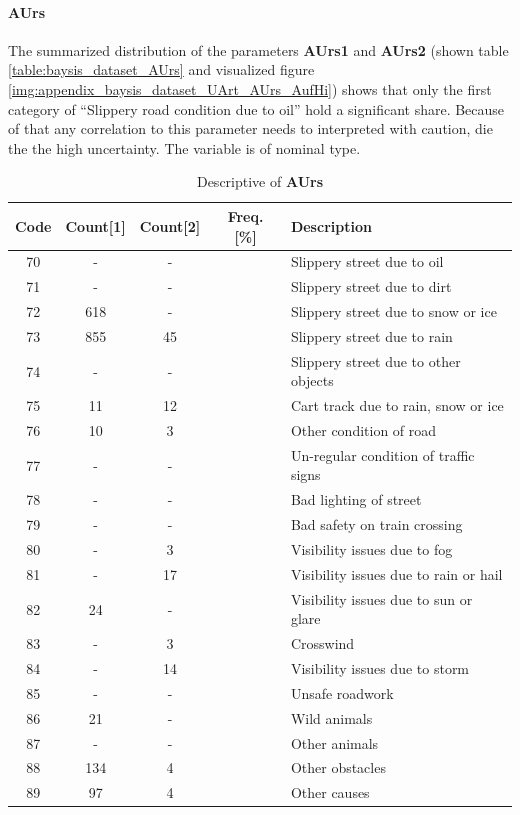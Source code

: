 \paragraph{AUrs}
The summarized distribution of the parameters \textbf{AUrs1} and \textbf{AUrs2} (shown table \autoref{table:baysis_dataset_AUrs} and visualized figure \autoref{img:appendix_baysis_dataset_UArt_AUrs_AufHi}) shows that only the first category of “Slippery road condition due to oil” hold a significant share. Because of that any correlation to this parameter needs to interpreted with caution, die the the high uncertainty. The variable is of nominal type.
\begin{table}[ht]
	\centering
	\small
	\begin{tabular}{c|c|c|c|l}
		\toprule
		Code & Count[1] & Count[2] & Freq. [\%] & Description \\ 
		\midrule
		70 & - 		& -		& & Slippery street due to oil \\
		71 & -		& -		& & Slippery street due to dirt \\
		72 & 618	& -		& & Slippery street due to snow or ice \\
		73 & 855	& 45	& & Slippery street due to rain \\
		74 & -		& -		& & Slippery street due to other objects \\
		75 & 11		& 12	& & Cart track due to rain, snow or ice \\
		76 & 10		& 3		& & Other condition of road \\
		77 & -		& -		& & Un-regular condition of traffic signs \\
		78 & -		& -		& & Bad lighting of street \\
		79 & -		& -		& & Bad safety on train crossing \\
		80 & -		& 3		& & Visibility issues due to fog \\
		81 & -		& 17 	& & Visibility issues due to rain or hail \\
		82 & 24		& -		& & Visibility issues due to sun or glare \\
		83 & -		& 3		& & Crosswind \\
		84 & -		& 14	& & Visibility issues due to storm \\
		85 & -		& -		& & Unsafe roadwork \\
		86 & 21		& -		& & Wild animals \\
		87 & -		& -		& & Other animals \\
		88 & 134	& 4		& & Other obstacles \\
		89 & 97		& 4		& & Other causes \\
		\bottomrule
	\end{tabular}
	\caption{Descriptive of \textbf{AUrs}}
	\label{table:baysis_dataset_AUrs}
	\vspace{-8mm}
\end{table}

